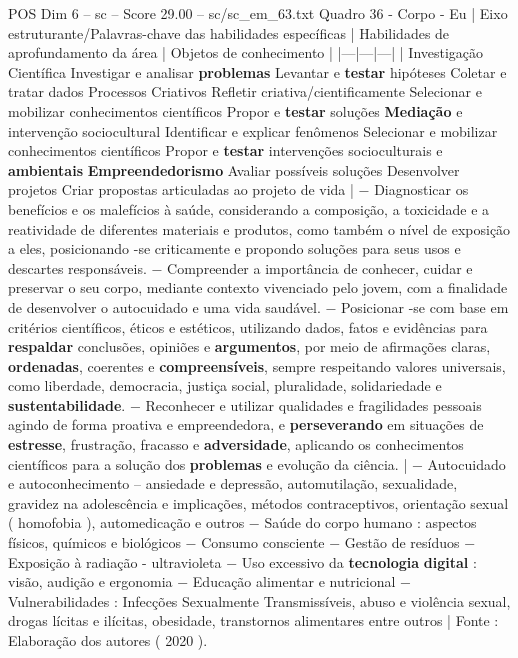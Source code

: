 \begin{textsample}{POS Dim 6 – sc – Score 29.00 – sc/sc\_em\_63.txt}
Quadro 36 - Corpo - Eu | Eixo estruturante/Palavras-chave das habilidades específicas | Habilidades de aprofundamento da área | Objetos de conhecimento | |---|---|---| | Investigação Científica Investigar e analisar \textbf{problemas} Levantar e \textbf{testar} hipóteses Coletar e tratar dados Processos Criativos Refletir criativa/cientificamente Selecionar e mobilizar conhecimentos científicos Propor e \textbf{testar} soluções \textbf{Mediação} e intervenção sociocultural Identificar e explicar fenômenos Selecionar e mobilizar conhecimentos científicos Propor e \textbf{testar} intervenções socioculturais e \textbf{ambientais} \textbf{Empreendedorismo} Avaliar possíveis soluções Desenvolver projetos Criar propostas articuladas ao projeto de vida | − Diagnosticar os benefícios e os malefícios à saúde, considerando a composição, a toxicidade e a reatividade de diferentes materiais e produtos, como também o nível de exposição a eles, posicionando -se criticamente e propondo soluções para seus usos e descartes responsáveis. − Compreender a importância de conhecer, cuidar e preservar o seu corpo, mediante contexto vivenciado pelo jovem, com a finalidade de desenvolver o autocuidado e uma vida saudável. − Posicionar -se com base em critérios científicos, éticos e estéticos, utilizando dados, fatos e evidências para \textbf{respaldar} conclusões, opiniões e \textbf{argumentos}, por meio de afirmações claras, \textbf{ordenadas}, coerentes e \textbf{compreensíveis}, sempre respeitando valores universais, como liberdade, democracia, justiça social, pluralidade, solidariedade e \textbf{sustentabilidade}. − Reconhecer e utilizar qualidades e fragilidades pessoais agindo de forma proativa e empreendedora, e \textbf{perseverando} em situações de \textbf{estresse}, frustração, fracasso e \textbf{adversidade}, aplicando os conhecimentos científicos para a solução dos \textbf{problemas} e evolução da ciência. | − Autocuidado e autoconhecimento – ansiedade e depressão, automutilação, sexualidade, gravidez na adolescência e implicações, métodos contraceptivos, orientação sexual ( homofobia ), automedicação e outros − Saúde do corpo humano : aspectos físicos, químicos e biológicos − Consumo consciente − Gestão de resíduos − Exposição à radiação - ultravioleta − Uso excessivo da \textbf{tecnologia} \textbf{digital} : visão, audição e ergonomia − Educação alimentar e nutricional − Vulnerabilidades : Infecções Sexualmente Transmissíveis, abuso e violência sexual, drogas lícitas e ilícitas, obesidade, transtornos alimentares entre outros | Fonte : Elaboração dos autores ( 2020 ).

\end{textsample}
